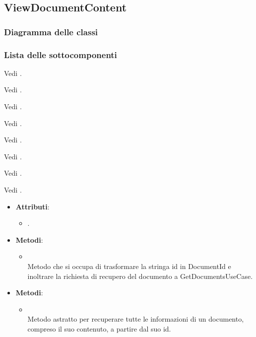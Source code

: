 \documentclass[10pt, a4paper]{article}
\begin{document}
\subsection{ViewDocumentContent}
\subsubsection{Diagramma delle classi}
\subsubsection{Lista delle sottocomponenti}

Vedi .

Vedi .

Vedi .

Vedi .

Vedi .

Vedi .

Vedi .

Vedi .

\label{GetDocumentControllerDettaglio}
\begin{itemize}
    \item \textbf{Attributi}:
    \begin{itemize}
        \item {}.
    \end{itemize}
    \item \textbf{Metodi}:
    \begin{itemize}
        \item {}\\
        Metodo che si occupa di trasformare la stringa id in DocumentId e inoltrare la richiesta di recupero del documento a GetDocumentsUseCase.
    \end{itemize}
\end{itemize}

\label{GetDocumentUseCaseDettaglio}
\begin{itemize}
    \item \textbf{Metodi}:
    \begin{itemize}
        \item {}\\
        Metodo astratto per recuperare tutte le informazioni di un documento, compreso il suo contenuto, a partire dal suo id.
    \end{itemize}
\end{itemize}
\end{document}
